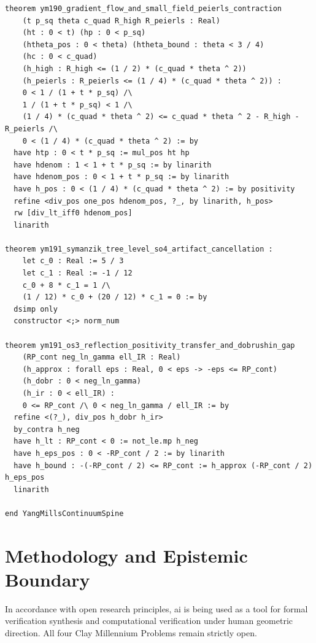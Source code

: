 \documentclass[11pt,a4paper]{article}
\begin{document}
\begin{lstlisting}[language=Lean4]
theorem ym190_gradient_flow_and_small_field_peierls_contraction
    (t p_sq theta c_quad R_high R_peierls : Real)
    (ht : 0 < t) (hp : 0 < p_sq)
    (htheta_pos : 0 < theta) (htheta_bound : theta < 3 / 4)
    (hc : 0 < c_quad)
    (h_high : R_high <= (1 / 2) * (c_quad * theta ^ 2))
    (h_peierls : R_peierls <= (1 / 4) * (c_quad * theta ^ 2)) :
    0 < 1 / (1 + t * p_sq) /\
    1 / (1 + t * p_sq) < 1 /\
    (1 / 4) * (c_quad * theta ^ 2) <= c_quad * theta ^ 2 - R_high - R_peierls /\
    0 < (1 / 4) * (c_quad * theta ^ 2) := by
  have htp : 0 < t * p_sq := mul_pos ht hp
  have hdenom : 1 < 1 + t * p_sq := by linarith
  have hdenom_pos : 0 < 1 + t * p_sq := by linarith
  have h_pos : 0 < (1 / 4) * (c_quad * theta ^ 2) := by positivity
  refine <div_pos one_pos hdenom_pos, ?_, by linarith, h_pos>
  rw [div_lt_iff0 hdenom_pos]
  linarith

theorem ym191_symanzik_tree_level_so4_artifact_cancellation :
    let c_0 : Real := 5 / 3
    let c_1 : Real := -1 / 12
    c_0 + 8 * c_1 = 1 /\
    (1 / 12) * c_0 + (20 / 12) * c_1 = 0 := by
  dsimp only
  constructor <;> norm_num

theorem ym191_os3_reflection_positivity_transfer_and_dobrushin_gap
    (RP_cont neg_ln_gamma ell_IR : Real)
    (h_approx : forall eps : Real, 0 < eps -> -eps <= RP_cont)
    (h_dobr : 0 < neg_ln_gamma)
    (h_ir : 0 < ell_IR) :
    0 <= RP_cont /\ 0 < neg_ln_gamma / ell_IR := by
  refine <(?_), div_pos h_dobr h_ir>
  by_contra h_neg
  have h_lt : RP_cont < 0 := not_le.mp h_neg
  have h_eps_pos : 0 < -RP_cont / 2 := by linarith
  have h_bound : -(-RP_cont / 2) <= RP_cont := h_approx (-RP_cont / 2) h_eps_pos
  linarith

end YangMillsContinuumSpine
\end{lstlisting}

\section{Methodology and Epistemic Boundary}
\noindent In accordance with open research principles, ai is being used as a tool for formal verification synthesis and computational verification under human geometric direction. All four Clay Millennium Problems remain strictly open.
\end{document}
